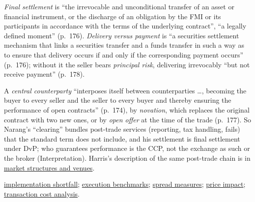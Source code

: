 \begin{qfdefinition}
\begin{itemize}
\emph{Final settlement} is ``the irrevocable and unconditional transfer of an asset or financial instrument, or the discharge of an obligation by the FMI or its participants in accordance with the terms of the underlying contract'', ``a legally defined moment'' (p.~176). \emph{Delivery versus payment} is ``a securities settlement mechanism that links a securities transfer and a funds transfer in such a way as to ensure that delivery occurs if and only if the corresponding payment occurs'' (p.~176); without it the seller bears \emph{principal risk}, delivering irrevocably ``but not receive payment'' (p.~178).

A \emph{central counterparty} ``interposes itself between counterparties \dots, becoming the buyer to every seller and the seller to every buyer and thereby ensuring the performance of open contracts'' (p.~174), by \emph{novation}, which replaces the original contract with two new ones, or by \emph{open offer} at the time of the trade (p.~177). So Narang's ``clearing'' bundles post-trade services (reporting, tax handling, fails) that the standard term does not include, and his settlement is final settlement under DvP; who guarantees performance is the CCP, not the exchange as such or the broker (Interpretation). Harris's description of the same post-trade chain is in \hyperref[def:market-structures-venues]{market structures and venues}.
\end{itemize}

 \hyperref[def:implementation-shortfall]{implementation shortfall}; \hyperref[def:execution-benchmark]{execution benchmarks}; \hyperref[def:spread-measures]{spread measures}; \hyperref[def:price-impact]{price impact}; \hyperref[meth:transaction-cost-analysis]{transaction cost analysis}.

\end{qfdefinition}

